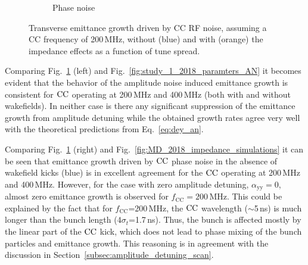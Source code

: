 \begin{figure}[!ht]
\begin{subfigure}[t]{0.45\textwidth}
        \caption{Phase noise}
    \end{subfigure}
    \hfill
     \caption{Transverse emittance growth driven by CC RF noise, assuming a CC frequency of 200\,MHz, without (blue) and with (orange) the impedance effects as a function of tune spread.} %
     \label{fig:CC_200MHz_amplitude_phase_noise}
 \end{figure}
 
 
 Comparing Fig.~\ref{fig:CC_200MHz_amplitude_phase_noise} (left) and Fig.~\ref{fig:study_1_2018_paramters_AN} it becomes evident that the behavior of the amplitude noise induced emittance growth is consistent for ${\mathrm{CC}}$ operating at 200\,MHz and 400\,MHz (both with and without wakefields). In neither case is there any significant suppression of the emittance growth from amplitude detuning while the obtained growth rates agree very well with the theoretical predictions from Eq.~\eqref{eq:dey_an}.
 
 Comparing Fig.~\ref{fig:CC_200MHz_amplitude_phase_noise} (right) and Fig.~\ref{fig:MD_2018_impedance_simulations} it can be seen that emittance growth driven by ${\mathrm{CC}}$ phase noise in the absence of wakefield kicks (blue) is in excellent agreement for the ${\mathrm{CC}}$ operating at 200\,MHz and 400\,MHz. However, for the case with zero amplitude detuning, $\alpha_\mathrm{yy}=0$, almost zero emittance growth is observed for $f_\mathrm{CC}=200$\,MHz. This could be explained by the fact that for $f_\mathrm{CC}$=200\,MHz, the ${\mathrm{CC}}$ wavelength ($\sim$5\,ns) is much longer than the bunch length ($4\sigma_t$=1.7\,ns). Thus, the bunch is affected mostly by the linear part of the ${\mathrm{CC}}$ kick, which does not lead to phase mixing of the bunch particles and emittance growth. This reasoning is in agreement with the discussion in Section~\ref{subsec:amplitude_detuning_scan}.
 
  
 
 
 
 

